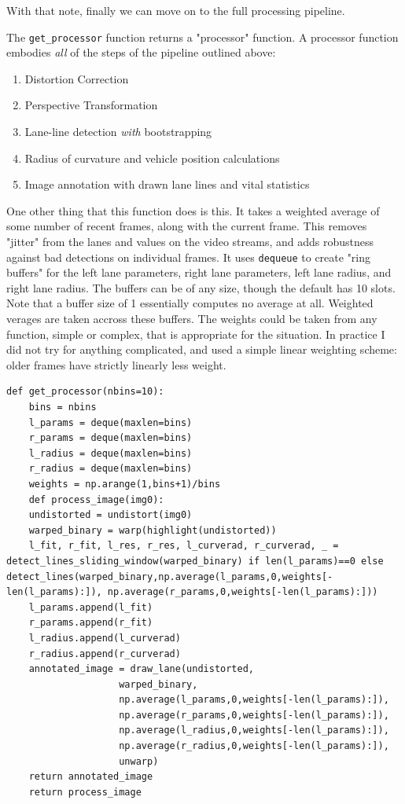 \documentclass[11pt]{article}
\begin{document}
With that note, finally we can move on to the full processing
pipeline.  

The \texttt{get\_processor} function returns a "processor" function.  A
processor function embodies \emph{all} of the steps of the pipeline
outlined above:

\begin{enumerate}
\item Distortion Correction
\item Perspective Transformation
\item Lane-line detection \emph{with} bootstrapping
\item Radius of curvature and vehicle position calculations
\item Image annotation with drawn lane lines and vital statistics
\end{enumerate}

One other thing that this function does is this.  It takes a
weighted average of some number of recent frames, along with the
current frame.  This removes "jitter" from the lanes and values
on the video streams, and adds robustness against bad detections
on individual frames.  It uses \texttt{dequeue} to create "ring
buffers" for the left lane parameters, right lane parameters,
left lane radius, and right lane radius.  The buffers can be of
any size, though the default has 10 slots.  Note that a buffer
size of 1 essentially computes no average at all.  Weighted
verages are taken accross these buffers.  The weights could be
taken from any function, simple or complex, that is appropriate
for the situation.  In practice I did not try for anything
complicated, and used a simple linear weighting scheme:  older
frames have strictly linearly less weight.

\begin{verbatim}
def get_processor(nbins=10):
    bins = nbins
    l_params = deque(maxlen=bins)
    r_params = deque(maxlen=bins)
    l_radius = deque(maxlen=bins)
    r_radius = deque(maxlen=bins)
    weights = np.arange(1,bins+1)/bins
    def process_image(img0):
	undistorted = undistort(img0)
	warped_binary = warp(highlight(undistorted))
	l_fit, r_fit, l_res, r_res, l_curverad, r_curverad, _ = detect_lines_sliding_window(warped_binary) if len(l_params)==0 else detect_lines(warped_binary,np.average(l_params,0,weights[-len(l_params):]), np.average(r_params,0,weights[-len(l_params):]))
	l_params.append(l_fit)
	r_params.append(r_fit)
	l_radius.append(l_curverad)
	r_radius.append(r_curverad)
	annotated_image = draw_lane(undistorted,
				    warped_binary,
				    np.average(l_params,0,weights[-len(l_params):]),
				    np.average(r_params,0,weights[-len(l_params):]),
				    np.average(l_radius,0,weights[-len(l_params):]),
				    np.average(r_radius,0,weights[-len(l_params):]),
				    unwarp)
	return annotated_image
    return process_image
\end{verbatim}
\end{document}
